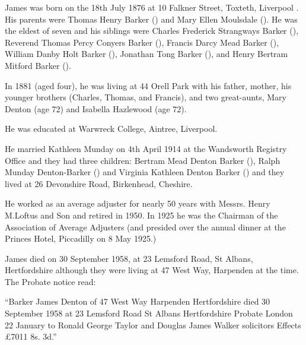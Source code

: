 
James was born on the 18th July 1876 at 10 Falkner Street, Toxteth, Liverpool \cite{JamesDBarkerBirth}. His parents were  Thomas Henry Barker () and Mary Ellen Moulsdale (). He was the eldest of seven and his siblings were Charles Frederick Strangways Barker (),  Reverend Thomas Percy Conyers Barker (), Francis Darcy Mead Barker (), William Danby Holt Barker (), Jonathan Tong Barker (), and Henry Bertram Mitford Barker ().

In 1881 (aged four), he was living at 44 Orell Park with his father, mother, his younger brothers (Charles, Thomas, and Francis), and two great-aunts, Mary Denton (age 72) and Isabella Hazlewood (age 72).\cite{UKCensusRG11_3688}

He was educated at Warwreck College, Aintree, Liverpool.

He married Kathleen Munday on 4th April 1914 at the Wandsworth Registry Office \cite{JamesDBarkerMarriage} and they had three children: Bertram Mead Denton Barker (), Ralph Munday Denton-Barker () and Virginia Kathleen Denton Barker ()  and they lived at 26 Devonshire Road, Birkenhead, Cheshire.

He worked as an average adjuster for nearly 50 years with Messrs. Henry M.Loftus and Son and retired in 1950. In 1925 he was the Chairman of the Association of Average Adjusters (and presided over the annual dinner at the Princes Hotel, Piccadilly on 8 May 1925.)

James died on 30 September 1958, at 23 Lemsford Road, St Albans, Hertfordshire \cite{JamesDBarkerDeath} although they were living at 47 West Way, Harpenden at the time. The Probate notice read:

``Barker James Denton of 47 West Way Harpenden Hertfordshire died 30 September 1958 at 23 Lemsford Road St Albans Hertfordshire Probate London 22 January to Ronald George Taylor and Douglas James Walker solicitors Effects £7011 8s. 3d.''
